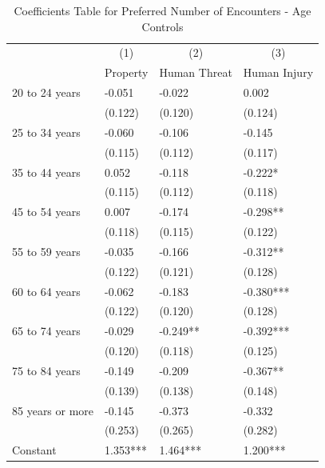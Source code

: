 \documentclass[english,12pt]{article}
\begin{document}
\begin{table}[H]
    \centering
    \caption{Coefficients Table for Preferred Number of Encounters - Age Controls}
    \footnotesize
    \begin{tabular}{@{}llll@{}}
        \toprule
                           &\multicolumn{1}{c}{(1)}   &\multicolumn{1}{c}{(2)}   &\multicolumn{1}{c}{(3)}  \\
                           & Property & Human Threat & Human Injury \\ \midrule
        20 to 24 years&      -0.051   &      -0.022   &       0.002   \\
                    &     (0.122)   &     (0.120)   &     (0.124)   \\
        25 to 34 years&      -0.060   &      -0.106   &      -0.145   \\
                    &     (0.115)   &     (0.112)   &     (0.117)   \\
        35 to 44 years&       0.052   &      -0.118   &      -0.222*  \\
                    &     (0.115)   &     (0.112)   &     (0.118)   \\
        45 to 54 years&       0.007   &      -0.174   &      -0.298** \\
                    &     (0.118)   &     (0.115)   &     (0.122)   \\
        55 to 59 years&      -0.035   &      -0.166   &      -0.312** \\
                    &     (0.122)   &     (0.121)   &     (0.128)   \\
        60 to 64 years&      -0.062   &      -0.183   &      -0.380***\\
                    &     (0.122)   &     (0.120)   &     (0.128)   \\
        65 to 74 years&      -0.029   &      -0.249** &      -0.392***\\
                    &     (0.120)   &     (0.118)   &     (0.125)   \\
        75 to 84 years&      -0.149   &      -0.209   &      -0.367** \\
                    &     (0.139)   &     (0.138)   &     (0.148)   \\
        85 years or more&      -0.145   &      -0.373   &      -0.332   \\
                    &     (0.253)   &     (0.265)   &     (0.282)   \\\midrule                       
        Constant    &       1.353***&       1.464***&       1.200***\\

\end{tabular}
\end{table}
\end{document}
